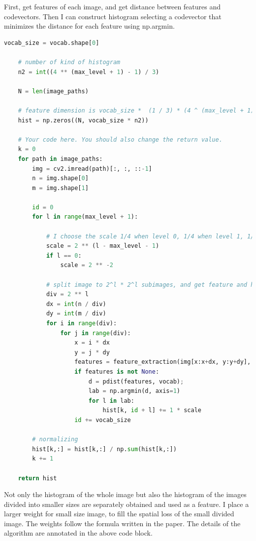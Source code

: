 First, get features of each image, and get distance between features and codevectors. Then I can construct histogram selecting a codevector that minimizes the distance for each feature using np.argmin.

\lstset{numbers = left, numbersep=5pt, breaklines=true}
\begin{lstlisting}[language=python, caption = {Spatial pyramid representation}]
    vocab_size = vocab.shape[0]
    
    # number of kind of histogram
    n2 = int((4 ** (max_level + 1) - 1) / 3)

    N = len(image_paths)
    
    # feature dimension is vocab_size *  (1 / 3) * (4 ^ (max_level + 1) - 1)
    hist = np.zeros((N, vocab_size * n2))

    # Your code here. You should also change the return value.
    k = 0
    for path in image_paths:
        img = cv2.imread(path)[:, :, ::-1]
        n = img.shape[0]
        m = img.shape[1]

        id = 0
        for l in range(max_level + 1):
            
            # I choose the scale 1/4 when level 0, 1/4 when level 1, 1/2 when level 2, as in the paper.
            scale = 2 ** (l - max_level - 1)
            if l == 0:
                scale = 2 ** -2
                
            # split image to 2^l * 2^l subimages, and get feature and histogram each splitted images.
            div = 2 ** l
            dx = int(n / div)
            dy = int(m / div)
            for i in range(div):
                for j in range(div):
                    x = i * dx
                    y = j * dy
                    features = feature_extraction(img[x:x+dx, y:y+dy], feature)
                    if features is not None:
                        d = pdist(features, vocab);
                        lab = np.argmin(d, axis=1)
                        for l in lab:
                            hist[k, id + l] += 1 * scale
                    id += vocab_size
        
        # normalizing
        hist[k,:] = hist[k,:] / np.sum(hist[k,:])
        k += 1
        
    return hist
\end{lstlisting}

Not only the histogram of the whole image but also the histogram of the images divided into smaller sizes are separately obtained and used as a feature. I place a larger weight for small size image, to fill the spatial loss of the small divided image. The weights follow the formula written in the paper. The details of the algorithm are annotated in the above code block.

